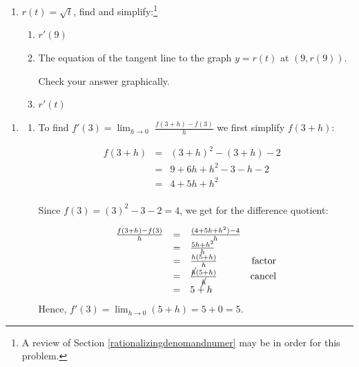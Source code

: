 \documentclass{ximera}
\begin{document}
\begin{example}
\begin{enumerate}
\item  $r(t) = \sqrt{t}$,  find and simplify:\footnote{A review of Section \ref{rationalizingdenomandnumer} may be in order for this problem.}

\begin{enumerate}

\item $r'(9)$ %

\item  The equation of the tangent line to the graph $y = r(t)$ at $(9, r(9))$.

 Check your answer graphically.


 \item $r'(t)$ %
 
 \end{enumerate}

\end{enumerate}

\begin{explanation}
 
\begin{enumerate}

\item \begin{enumerate} \item To find $f'(3) =\lim_{h \rightarrow 0}$ $\frac{f(3+h)-f(3)}{h}$ we first simplify $f(3+h)$:

\[ \begin{array}{rclr}  
  f(3+h) & = & (3+h)^2 - (3+h) -2 & \\ 
  & = & 9 + 6h+h^2 - 3 - h -2 & \\
 & = & 4 + 5h + h^2 & \\
 \end{array} \]

Since $f(3) = (3)^2-3-2 = 4$, we get for the difference quotient:

\[ \begin{array}{rclr}

 \frac{f(3+h)-f(3)}{h} & = &  \frac{(4 + 5h + h^2) -4}{h} & \\ 
                                & = &  \frac{5h+h^2}{h} & \\ 
                                & = &   \frac{h(5+h)}{h} & \text{factor} \\ 
                                & = &   \frac{\cancel{h}(5+h)}{\cancel{h}} & \text{cancel}\\ 
                                & = & 5+h \\ \end{array} \]
 Hence, $f'(3) = \lim_{h \rightarrow 0} (5+h) = 5+0 = 5$.
 

\end{enumerate}
\end{enumerate}
\end{explanation}
\end{example}
\end{document}
